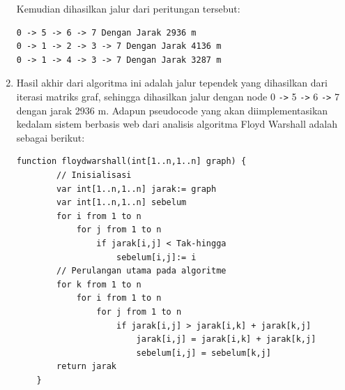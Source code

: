 \begin{enumerate}
    \par Kemudian dihasilkan jalur dari peritungan tersebut:
\begin{verbatim}
0 -> 5 -> 6 -> 7 Dengan Jarak 2936 m
0 -> 1 -> 2 -> 3 -> 7 Dengan Jarak 4136 m
0 -> 1 -> 4 -> 3 -> 7 Dengan Jarak 3287 m
\end{verbatim}
        
        \item Hasil akhir dari algoritma ini adalah jalur tependek yang dihasilkan dari iterasi matriks graf, sehingga dihasilkan jalur dengan node 0 \verb|->| 5 \verb|->| 6 \verb|->| 7 dengan jarak 2936 m. Adapun pseudocode yang akan diimplementasikan kedalam sistem berbasis web dari analisis algoritma Floyd Warshall adalah sebagai berikut:
        
\begin{lstlisting}[caption=Pseudocode Algoritma Floyd Warshall]
    function floydwarshall(int[1..n,1..n] graph) {
        // Inisialisasi
        var int[1..n,1..n] jarak:= graph
        var int[1..n,1..n] sebelum
        for i from 1 to n
            for j from 1 to n
                if jarak[i,j] < Tak-hingga
                    sebelum[i,j]:= i
        // Perulangan utama pada algoritme
        for k from 1 to n
            for i from 1 to n
                for j from 1 to n
                    if jarak[i,j] > jarak[i,k] + jarak[k,j]
                        jarak[i,j] = jarak[i,k] + jarak[k,j]
                        sebelum[i,j] = sebelum[k,j]
        return jarak
    }
\end{lstlisting}
\label{PseudocodeAlgoritmaFloydWarshall}
\end{enumerate}